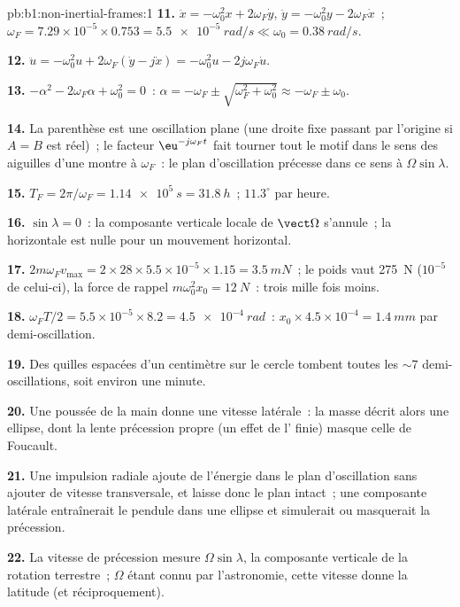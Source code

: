 \begin{solution}{pb:b1:non-inertial-frames:1}
\textbf{11.} $\ddot x = -\omega_0^2x + 2\omega_F\dot y$, $\ddot y = -\omega_0^2y -
2\omega_F\dot x$~; $\omega_F = 7.29\times10^{-5} \times 0.753 = \qty{5.5e-5}{rad/s}
\ll \omega_0 = \qty{0.38}{rad/s}$.

\textbf{12.} $\ddot u = -\omega_0^2u + 2\omega_F(\dot y - j\dot x) = -\omega_0^2u -
2j\omega_F\dot u$.

\textbf{13.} $-\alpha^2 - 2\omega_F\alpha + \omega_0^2 = 0$~: $\alpha = -\omega_F \pm
\sqrt{\omega_F^2 + \omega_0^2} \approx -\omega_F \pm \omega_0$.

\textbf{14.} La parenthèse est une oscillation plane (une droite fixe
passant par l'origine si $A = B$ est réel)~; le facteur
$\eu^{-j\omega_Ft}$ fait tourner tout le motif dans le sens des aiguilles
d'une montre à $\omega_F$~: le plan d'oscillation précesse dans ce sens à
$\Omega\sin\lambda$.

\textbf{15.} $T_F = 2\pi/\omega_F = \qty{1.14e5}{s} = \qty{31.8}{h}$~; $11.3^\circ$
par heure.

\textbf{16.} $\sin\lambda = 0$~: la composante verticale locale de
$\vect\Omega$ s'annule~; la  horizontale est nulle pour
un mouvement horizontal.

\textbf{17.} $2m\omega_Fv_{\max} = 2 \times 28 \times 5.5\times10^{-5} \times 1.15 =
\qty{3.5}{mN}$~; le poids vaut \qty{275}{N} ($10^{-5}$ de celui-ci), la
force de rappel $m\omega_0^2x_0 = \qty{12}{N}$~: trois mille fois moins.

\textbf{18.} $\omega_FT/2 = 5.5\times10^{-5} \times 8.2 = \qty{4.5e-4}{rad}$~:
$x_0 \times 4.5\times10^{-4} = \qty{1.4}{mm}$ par demi-oscillation.

\textbf{19.} Des quilles espacées d'un centimètre sur le cercle tombent
toutes les $\sim 7$ demi-oscillations, soit environ une minute.

\textbf{20.} Une poussée de la main donne une vitesse latérale~: la masse
décrit alors une ellipse, dont la lente précession propre (un effet de
l' finie) masque celle de Foucault.

\textbf{21.} Une impulsion radiale ajoute de l'énergie dans le plan
d'oscillation sans ajouter de vitesse transversale, et laisse donc le
plan intact~; une composante latérale entraînerait le pendule dans une
ellipse et simulerait ou masquerait la précession.

\textbf{22.} La vitesse de précession mesure $\Omega\sin\lambda$, la
composante verticale de la rotation terrestre~; $\Omega$ étant connu par
l'astronomie, cette vitesse donne la latitude (et réciproquement).


\end{solution}
